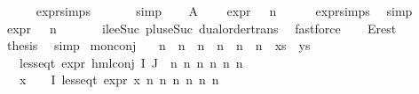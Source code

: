 \begin{isabellebody}
\ \ \ \ \isamarkupfalse%
\ expr{\isachardot}{\kern0pt}simps\ \isanewline
\ \ \ \ \isamarkupfalse%
\ simp\isanewline
\ \ \isamarkupfalse%
\ A{}\ \isamarkupfalse%
\ {\isachardoublequoteopen}{}\ {\isacharplus}{\kern0pt}\ expr{\isacharunderscore}{\kern0pt}{}\ {\isasymphi}\ {\isasymle}\ n{}{\isachardoublequoteclose}\isanewline
\ \ \ \ \isamarkupfalse%
\ expr{\isacharunderscore}{\kern0pt}{}{\isachardot}{\kern0pt}simps{\isacharparenleft}{\kern0pt}{}{\isacharparenright}{\kern0pt}\ \isamarkupfalse%
\ simp\isanewline
\ \ \isamarkupfalse%
\ {\isachardoublequoteopen}expr{\isacharunderscore}{\kern0pt}{}\ {\isasymphi}\ {\isasymle}\ n{}{\isachardoublequoteclose}\ \isanewline
\ \ \ \ \isamarkupfalse%
\ ile{\isacharunderscore}{\kern0pt}eSuc\ plus{\isacharunderscore}{\kern0pt}{}{\isacharunderscore}{\kern0pt}eSuc{\isacharparenleft}{\kern0pt}{}{\isacharparenright}{\kern0pt}\ dual{\isacharunderscore}{\kern0pt}order{\isachardot}{\kern0pt}trans\ \isamarkupfalse%
\ fastforce\isanewline
\ \ \isamarkupfalse%
\ E{\isacharunderscore}{\kern0pt}rest\ \isamarkupfalse%
\ {\isacharquery}{\kern0pt}thesis\ \isamarkupfalse%
\ simp\isanewline
{}\isamarkupfalse%
%
\endisatagproof
{\isafoldproof}%
%
\isadelimproof
\isanewline
%
\endisadelimproof
\isanewline
{}\isamarkupfalse%
\ mon{\isacharunderscore}{\kern0pt}conj{\isacharcolon}{\kern0pt}\isanewline
\ \ \ n{}\ \ n{}\ \ n{}\ \ n{}\ \ n{}\ \ n{}\ \ xs\ \ ys\isanewline
\ \ \ {\isachardoublequoteopen}less{\isacharunderscore}{\kern0pt}eq{\isacharunderscore}{\kern0pt}t\ {\isacharparenleft}{\kern0pt}expr\ {\isacharparenleft}{\kern0pt}hml{\isacharunderscore}{\kern0pt}conj\ I\ J\ {\isasymPhi}{\isacharparenright}{\kern0pt}{\isacharparenright}{\kern0pt}\ {\isacharparenleft}{\kern0pt}n{}{\isacharcomma}{\kern0pt}\ n{}{\isacharcomma}{\kern0pt}\ n{}{\isacharcomma}{\kern0pt}\ n{}{\isacharcomma}{\kern0pt}\ n{}{\isacharcomma}{\kern0pt}\ n{}{\isacharparenright}{\kern0pt}{\isachardoublequoteclose}\isanewline
\ \ \ {\isachardoublequoteopen}{\isacharparenleft}{\kern0pt}{\isasymforall}x\ {\isasymin}\ {\isacharparenleft}{\kern0pt}{\isasymPhi}\ {\isacharbackquote}{\kern0pt}\ I{\isacharparenright}{\kern0pt}{\isachardot}{\kern0pt}\ less{\isacharunderscore}{\kern0pt}eq{\isacharunderscore}{\kern0pt}t\ {\isacharparenleft}{\kern0pt}expr\ x{\isacharparenright}{\kern0pt}\ {\isacharparenleft}{\kern0pt}n{}{\isacharcomma}{\kern0pt}\ n{}{\isacharcomma}{\kern0pt}\ n{}{\isacharcomma}{\kern0pt}\ n{}{\isacharcomma}{\kern0pt}\ n{}{\isacharcomma}{\kern0pt}\ n{}{\isacharparenright}{\kern0pt}{\isacharparenright}{\kern0pt}{\isachardoublequoteclose}\ \isanewline

\end{isabellebody}
